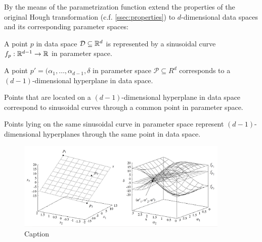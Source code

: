 By the means of the parametrization function \textcite{CASHachtert2008robust} extend the properties of the original Hough transformation (c.f. \autoref{ssec:properties}) to $d$-dimensional data spaces and its corresponding parameter spaces: 
\begin{quoting}
\begin{property}
A point $p$ in data space $\mathcal{D} \subseteq \mathbb{R}^d$ is represented by a sinusoidal curve $f_p:\mathbb{R}^{d-1}\rightarrow\mathbb{R}$ in parameter space.
\end{property}
\begin{property}
A point $p' = (\alpha_1,\dotsc,\alpha_{d-1},\delta$ in parameter space $\mathcal{P} \subseteq R^d$ corresponds to a $(d-1)$-dimensional hyperplane in data space.
\end{property}
\begin{property}
Points that are located on a $(d-1)$-dimensional hyperplane in data space correspond to sinusoidal curves through a common point in parameter space.
\end{property}
\begin{property}
Points lying on the same sinusoidal curve in parameter space represent $(d-1)$-dimensional hyperplanes through the same point in data space.
\end{property}
\end{quoting}

\begin{figure}
    \centering
    \includegraphics[width=0.9\textwidth]{figures/cash3d.png}
    \caption{Caption}
    \label{fig:cash3d}
\end{figure}

